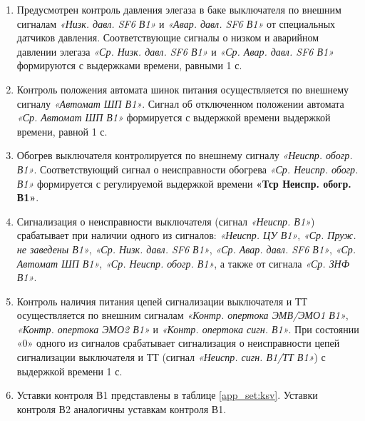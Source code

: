 \begin{enumerate}[label=\arabic{section}.\arabic{subsection}.\arabic{enumi}, labelsep=4pt, leftmargin=0pt, itemindent=57pt, itemsep=0pt, parsep=0pt]
\item
Предусмотрен контроль давления элегаза в баке выключателя по внешним сигналам \textit{«Низк. давл. SF6 В1»} и \textit{«Авар. давл. SF6 В1»} от специальных датчиков давления. Соответствующие сигналы о низком и аварийном давлении элегаза \textit{«Ср. Низк. давл. SF6 В1»} и \textit{«Ср. Авар. давл. SF6 В1»} формируются с выдержками времени, равными 1 с.

\item
Контроль положения автомата шинок питания осуществляется по внешнему сигналу \textit{«Автомат ШП В1»}. Сигнал об отключенном положении автомата \textit{«Ср. Автомат ШП В1»} формируется с выдержкой времени выдержкой времени, равной 1 с. 

\item
Обогрев выключателя контролируется по внешнему сигналу \textit{«Неиспр. обогр. В1»}. Соответствующий сигнал о неисправности обогрева \textit{«Ср. Неиспр. обогр. В1»} формируется с регулируемой выдержкой времени \textbf{«Тср Неиспр. обогр. В1»}.

\item
Сигнализация о неисправности выключателя (сигнал \textit{«Неиспр. В1»}) срабатывает при наличии одного из сигналов: \textit{«Неиспр. ЦУ В1»}, \textit{«Ср. Пруж. не заведены В1»}, \textit{«Ср. Низк. давл. SF6 В1»}, \textit{«Ср. Авар. давл. SF6 В1»}, \textit{«Ср. Автомат ШП В1»}, \textit{«Ср. Неиспр. обогр. В1»}, а также от сигнала \textit{«Ср. ЗНФ В1»}.

\item
Контроль наличия питания цепей сигнализации выключателя и ТТ осуществляется по внешним сигналам \textit{«Контр. опертока ЭМВ/ЭМО1 В1»}, \textit{«Контр. опертока ЭМО2 В1»} и \textit{«Контр. опертока сигн. В1»}. При состоянии «0» одного из сигналов срабатывает сигнализация о неисправности цепей сигнализации выключателя и ТТ (сигнал \textit{«Неиспр. сигн. В1/ТТ В1»}) с выдержкой времени 1 с. 


\item
Уставки контроля В1 представлены в таблице \ref{app_set:ksv}. Уставки контроля В2 аналогичны уставкам контроля В1.




\end{enumerate}
